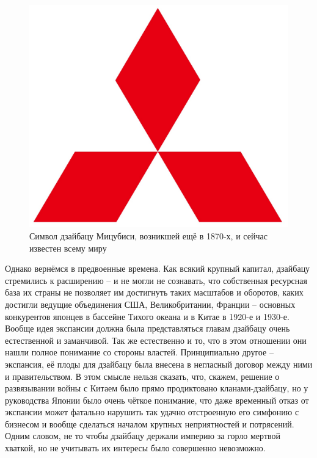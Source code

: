 \begin{figure}[h!tb] 
	\centering\includegraphics[scale=0.4]{Glava1/xVqA_r2Y8Bs.jpg}
	\caption{Символ дзайбацу Мицубиси, возникшей ещё в 1870-х, и сейчас известен всему миру}%
\end{figure}

Однако вернёмся в предвоенные времена. Как всякий крупный капитал, дзайбацу стремились к расширению – и не могли не сознавать, что собственная ресурсная база их страны не позволяет им достигнуть таких масштабов и оборотов, каких достигли ведущие объединения США, Великобритании, Франции – основных конкурентов японцев в бассейне Тихого океана и в Китае в 1920-е и 1930-е. Вообще идея экспансии должна была представляться главам дзайбацу очень естественной и заманчивой. Так же естественно и то, что в этом отношении они нашли полное понимание со стороны властей. Принципиально другое – экспансия, её плоды для дзайбацу была внесена в негласный договор между ними и правительством. В этом смысле нельзя сказать, что, скажем, решение о развязывании войны с Китаем было прямо продиктовано кланами-дзайбацу, но у руководства Японии было очень чёткое понимание, что даже временный отказ от экспансии может фатально нарушить так удачно отстроенную его симфонию с бизнесом и вообще сделаться началом крупных неприятностей и потрясений. Одним словом, не то чтобы дзайбацу держали империю за горло мертвой хваткой, но не учитывать их интересы было совершенно невозможно.

